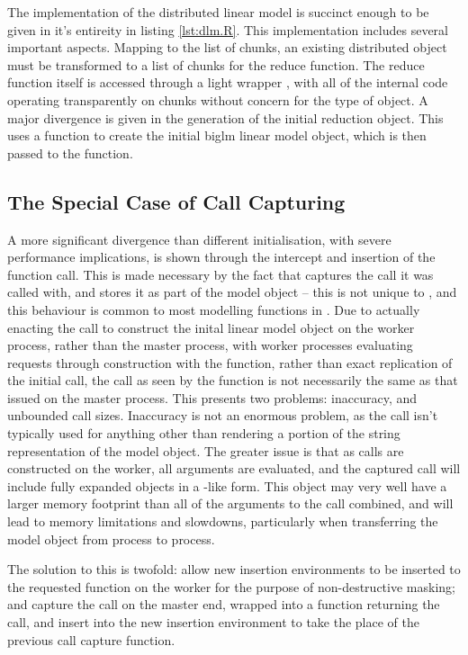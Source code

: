 \documentclass[a4paper, 10pt]{article}
\begin{document}
The implementation of the distributed linear model is succinct enough to be given in it's entireity in listing \ref{lst:dlm.R}.
This implementation includes several important aspects.
Mapping to the list of chunks, an existing distributed object must be transformed to a list of chunks for the reduce function.
The reduce function itself is accessed through a light wrapper , with all of the internal code operating transparently on chunks without concern for the type of object.
A major divergence is given in the generation of the initial reduction object.
This uses a  function to create the initial biglm linear model object, which is then passed to the  function.

\subsection{The Special Case of Call Capturing}
A more significant divergence than different initialisation, with severe performance implications, is shown through the intercept and insertion of the function call.
This is made necessary by the fact that  captures the call it was called with, and stores it as part of the model object -- this is not unique to , and this behaviour is common to most modelling functions in \R{}.
Due to actually enacting the call to construct the inital  linear model object on the worker process, rather than the master process, with worker processes evaluating requests through construction with the  function, rather than exact replication of the initial call, the call as seen by the function is not necessarily the same as that issued on the master process.
This presents two problems: inaccuracy, and unbounded call sizes.
Inaccuracy is not an enormous problem, as the call isn't typically used for anything other than rendering a portion of the string representation of the model object.
The greater issue is that as calls are constructed on the worker, all arguments are evaluated, and the captured call will include fully expanded objects in a -like form.
This object may very well have a larger memory footprint than all of the arguments to the call combined, and will lead to memory limitations and slowdowns, particularly when transferring the model object from process to process.

The solution to this is twofold: allow new insertion environments to be inserted to the requested function on the worker for the purpose of non-destructive masking; and capture the call on the master end, wrapped into a function returning the call, and insert into the new insertion environment to take the place of the previous call capture function.
\end{document}
